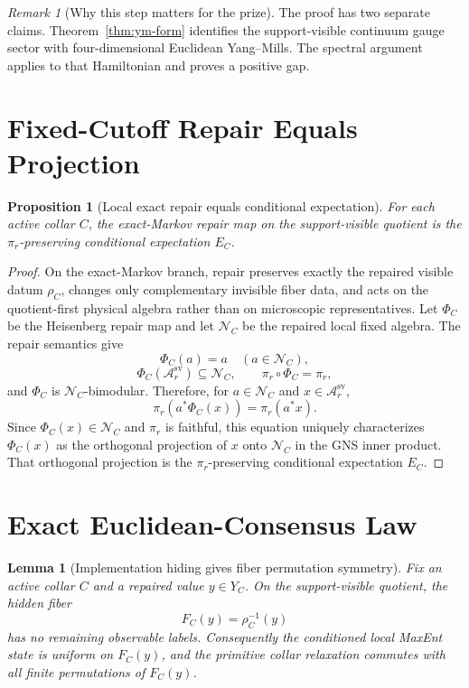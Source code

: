 \documentclass[11pt]{article}
\numberwithin{equation}{section}
\newtheorem{proposition}[theorem]{Proposition}
\newtheorem{lemma}[theorem]{Lemma}
\theoremstyle{remark}
\newtheorem{remark}[theorem]{Remark}
\newcommand{\A}{\mathcal A}
\begin{document}
\begin{remark}[Why this step matters for the prize]
The proof has two separate claims. Theorem~\ref{thm:ym-form} identifies the support-visible
continuum gauge sector with four-dimensional Euclidean Yang--Mills. The spectral argument applies
to that Hamiltonian and proves a positive gap.
\end{remark}

\section{Fixed-Cutoff Repair Equals Projection}

\begin{proposition}[Local exact repair equals conditional expectation]
\label{prop:local-repair}
For each active collar \(C\), the exact-Markov repair map on the support-visible quotient is the
\(\pi_r\)-preserving conditional expectation \(E_C\).
\end{proposition}

\begin{proof}
On the exact-Markov branch, repair preserves exactly the repaired visible datum \(\rho_C\), changes
only complementary invisible fiber data, and acts on the quotient-first physical algebra rather
than on microscopic representatives. Let \(\Phi_C\) be the Heisenberg repair map and let
\(\mathcal N_C\) be the repaired local fixed algebra. The repair semantics give
\[
\Phi_C(a)=a \quad (a\in\mathcal N_C),
\]
\[
\Phi_C(\A^{\mathrm{sv}}_r)\subseteq\mathcal N_C,
\qquad
\pi_r\circ\Phi_C=\pi_r,
\]
and \(\Phi_C\) is \(\mathcal N_C\)-bimodular. Therefore, for \(a\in\mathcal N_C\) and
\(x\in\A^{\mathrm{sv}}_r\),
\[
\pi_r\!\left(a^*\Phi_C(x)\right)=\pi_r(a^*x).
\]
Since \(\Phi_C(x)\in\mathcal N_C\) and \(\pi_r\) is faithful, this equation uniquely
characterizes \(\Phi_C(x)\) as the orthogonal projection of \(x\) onto \(\mathcal N_C\) in the
GNS inner product. That orthogonal projection is the \(\pi_r\)-preserving conditional expectation
\(E_C\).
\end{proof}

\section{Exact Euclidean-Consensus Law}

\begin{lemma}[Implementation hiding gives fiber permutation symmetry]
\label{lem:fiber-symmetry}
Fix an active collar \(C\) and a repaired value \(y\in Y_C\). On the support-visible quotient,
the hidden fiber
\[
F_C(y)=\rho_C^{-1}(y)
\]
has no remaining observable labels. Consequently the conditioned local MaxEnt state is uniform on
\(F_C(y)\), and the primitive collar relaxation commutes with all finite permutations of
\(F_C(y)\).
\end{lemma}
\end{document}

